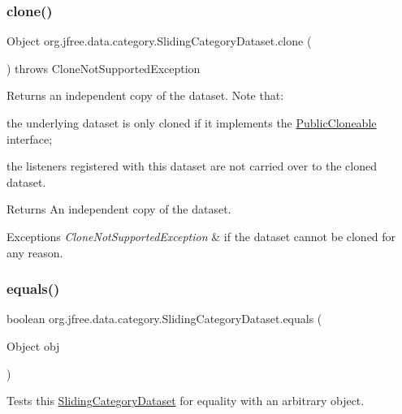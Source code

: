 \subsubsection{\texorpdfstring{clone()}{clone()}}
{\footnotesize\ttfamily Object org.\+jfree.\+data.\+category.\+Sliding\+Category\+Dataset.\+clone (\begin{DoxyParamCaption}{ }\end{DoxyParamCaption}) throws Clone\+Not\+Supported\+Exception}

Returns an independent copy of the dataset. Note that\+: 
\begin{DoxyItemize}
\item the underlying dataset is only cloned if it implements the \mbox{\hyperlink{}{Public\+Cloneable}} interface; 
\item the listeners registered with this dataset are not carried over to the cloned dataset. 
\end{DoxyItemize}

\begin{DoxyReturn}{Returns}
An independent copy of the dataset.
\end{DoxyReturn}

\begin{DoxyExceptions}{Exceptions}
{\em Clone\+Not\+Supported\+Exception} & if the dataset cannot be cloned for any reason. \\
\hline
\end{DoxyExceptions}
\mbox{\label{classorg_1_1jfree_1_1data_1_1category_1_1_sliding_category_dataset_a6dc6aeef2454ad771c4ff5c11d46a302}} 
\subsubsection{\texorpdfstring{equals()}{equals()}}
{\footnotesize\ttfamily boolean org.\+jfree.\+data.\+category.\+Sliding\+Category\+Dataset.\+equals (\begin{DoxyParamCaption}\item[{Object}]{obj }\end{DoxyParamCaption})}

Tests this {\ttfamily \mbox{\hyperlink{classorg_1_1jfree_1_1data_1_1category_1_1_sliding_category_dataset}{Sliding\+Category\+Dataset}}} for equality with an arbitrary object.


